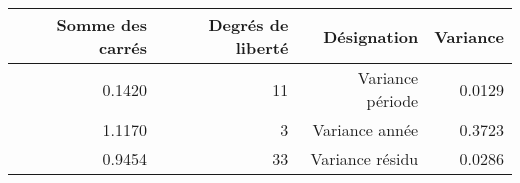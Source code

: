 \begin{tabular}{rrrr}
\toprule
    \textbf{Somme des carrés} & \textbf{Degrés de liberté} & \textbf{Désignation} & \textbf{Variance} \\
\midrule
    0.1420 & 11 & Variance période & 0.0129 \\ 
    1.1170 & 3 & Variance année & 0.3723 \\ 
    0.9454 & 33 & Variance résidu & 0.0286 \\ 
\bottomrule 
\end{tabular}